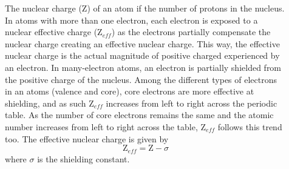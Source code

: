 \documentclass[main.tex]{subfiles}
\newcommand\chapterlabel{electrons}
\begin{document}
\sloppy
\begin{description}

\item[] 
The nuclear charge (Z) of an atom if the number of protons in the nucleus. In atoms with more than one electron, each electron is exposed to a nuclear effective charge ($\text{Z}_{eff}$) as the electrons partially compensate the nuclear charge creating an effective nuclear charge. This way, the effective nuclear charge is the actual magnitude of positive charged experienced by an electron. In many-electron atoms, an electron is partially shielded from the positive charge of the nucleus. Among the different types of electrons in an atoms (valence and core), core electrons are more effective at shielding, and as such $\text{Z}_{eff}$ increases from left to right across the periodic table. As the number of core electrons remains the same and the atomic number increases from left to right across the table, $\text{Z}_{eff}$ follows this trend too. The effective nuclear charge is given by
\begin{equation*}
\text{Z}_{eff}=\text{Z} - \sigma
\end{equation*}
where $\sigma$ is the shielding constant.





     \label{Fig:{\chapterlabel}\thefigurenewcounter}



\begin{center}
\end{center}
\end{description}
\end{document}
